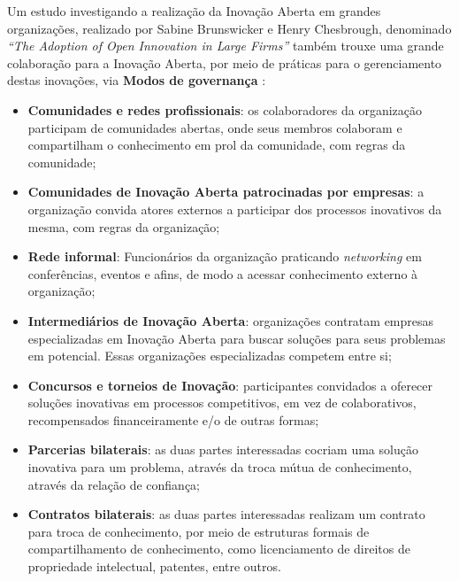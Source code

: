Um estudo investigando a realização da Inovação Aberta em grandes organizações, realizado por Sabine Brunswicker e Henry Chesbrough, denominado \textit{“The Adoption of Open Innovation in Large Firms”} também trouxe uma grande colaboração para a Inovação Aberta, por meio de práticas para o gerenciamento destas inovações, via \textbf{Modos de governança} \cite{brunswicker2018}:
\begin{itemize}
        \item \textbf{Comunidades e redes profissionais}: os colaboradores da organização participam de comunidades abertas, onde seus membros colaboram e compartilham o conhecimento em prol da comunidade, com regras da comunidade;
        \item \textbf{Comunidades de Inovação Aberta patrocinadas por empresas}: a organização convida atores externos a participar dos processos inovativos da mesma, com regras da organização;
        \item \textbf{Rede informal}: Funcionários da organização praticando \textit{networking} em conferências, eventos e afins, de modo a acessar conhecimento externo à organização;
        \item \textbf{Intermediários de Inovação Aberta}: organizações contratam empresas especializadas em Inovação Aberta para buscar soluções para seus problemas em potencial. Essas organizações especializadas competem entre si;
        \item \textbf{Concursos e torneios de Inovação}: participantes convidados a oferecer soluções inovativas em processos competitivos, em vez de colaborativos, recompensados financeiramente e/o de outras formas;
        \item \textbf{Parcerias bilaterais}: as duas partes interessadas cocriam uma solução inovativa para um problema, através da troca mútua de conhecimento, através da relação de confiança;
        \item \textbf{Contratos bilaterais}: as duas partes interessadas realizam um contrato para troca de conhecimento, por meio de estruturas formais de compartilhamento de conhecimento, como licenciamento de direitos de propriedade intelectual, patentes, entre outros.
\end{itemize}
